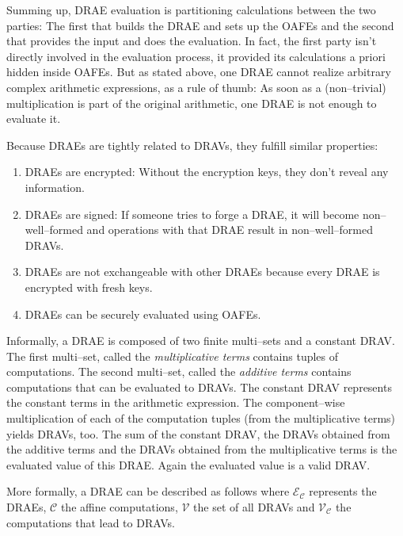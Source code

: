 Summing up, DRAE evaluation is partitioning calculations between the two
parties: The first that builds the DRAE and sets up the OAFEs and the second
that provides the input and does the evaluation. In fact, the first party isn't
directly involved in the evaluation process, it provided its calculations a
priori hidden inside OAFEs. But as stated above, one DRAE cannot realize
arbitrary complex arithmetic expressions, as a rule of thumb: As soon as a
(non--trivial) multiplication is part of the original arithmetic, one DRAE is
not enough to evaluate it.



Because DRAEs are tightly related to DRAVs, they fulfill similar properties:

\begin{enumerate}

  \item \label{prop:drae-encrypted} DRAEs are encrypted: Without the encryption
    keys, they don't reveal any information.

  \item \label{prop:drae-signed} DRAEs are signed: If someone tries to forge a
    DRAE, it will become non--well--formed and operations with that DRAE result
    in non--well--formed DRAVs.

  \item DRAEs are not exchangeable with other DRAEs because every DRAE is
    encrypted with fresh keys.

  \item \label{prop:drae-oafe} DRAEs can be securely evaluated using OAFEs.

\end{enumerate}

\noindent{}Informally, a DRAE is composed of two finite multi--sets and a
constant DRAV. The first multi--set, called the \emph{multiplicative terms}
contains tuples of computations. The second multi--set, called the
\emph{additive terms} contains computations that can be evaluated to DRAVs. The
constant DRAV represents the constant terms in the arithmetic expression. The
component--wise multiplication of each of the computation tuples (from the
multiplicative terms) yields DRAVs, too. The sum of the constant DRAV, the DRAVs
obtained from the additive terms and the DRAVs obtained from the multiplicative
terms is the evaluated value of this DRAE. Again the evaluated value is a valid
DRAV.

More formally, a DRAE can be described as follows where
$\mathcal{E}_\mathcal{C}$ represents the DRAEs, $\mathcal{C}$ the affine
computations, $\mathcal{V}$ the set of all DRAVs and $\mathcal{V}_\mathcal{C}$
the computations that lead to DRAVs.

